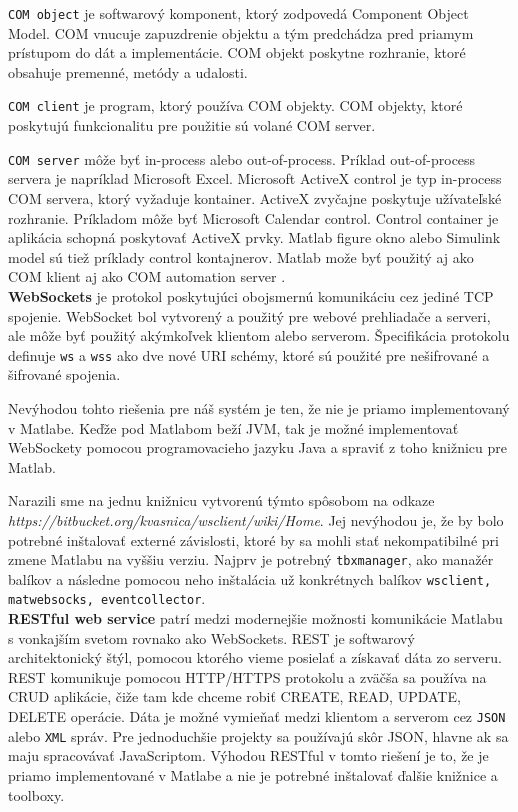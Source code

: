 \verb|COM object| je softwarový komponent, ktorý zodpovedá Component Object Model. COM vnucuje zapuzdrenie objektu a tým predchádza pred priamym prístupom do dát a implementácie. COM objekt poskytne rozhranie, ktoré obsahuje premenné, metódy a udalosti.

\verb|COM client| je program, ktorý používa COM objekty. COM objekty, ktoré poskytujú funkcionalitu pre použitie sú volané COM server.

\verb|COM server| môže byť in-process alebo out-of-process. Príklad out-of-process servera je napríklad Microsoft Excel. Microsoft ActiveX control je typ in-process COM servera, ktorý vyžaduje kontainer. ActiveX zvyčajne poskytuje užívateľské rozhranie. Príkladom môže byť Microsoft Calendar control. Control container je aplikácia schopná poskytovať ActiveX prvky. Matlab figure okno alebo Simulink model sú tiež príklady control kontajnerov. Matlab može byť použitý aj ako COM klient aj ako COM automation server \cite{matlab-com}.\\

\textbf{WebSockets} je protokol poskytujúci obojsmernú komunikáciu cez jediné TCP spojenie. WebSocket bol vytvorený a použitý pre webové prehliadače a serveri, ale môže byť použitý akýmkoľvek klientom alebo serverom. Špecifikácia protokolu definuje \verb|ws| a \verb|wss| ako dve nové URI schémy, ktoré sú použité pre nešifrované a šifrované spojenia.

Nevýhodou tohto riešenia pre náš systém je ten, že nie je priamo implementovaný v Matlabe. Keďže pod Matlabom beží JVM, tak je možné implementovať WebSockety pomocou programovacieho jazyku Java a spraviť z toho knižnicu pre Matlab.

Narazili sme na jednu knižnicu vytvorenú týmto spôsobom na odkaze\\ \textit{https://bitbucket.org/kvasnica/wsclient/wiki/Home}. Jej nevýhodou je, že by bolo potrebné inštalovať externé závislosti, ktoré by sa mohli stať nekompatibilné pri zmene Matlabu na vyššiu verziu. Najprv je potrebný \verb|tbxmanager|, ako manažér balíkov a následne pomocou neho inštalácia už konkrétnych balíkov \verb|wsclient, matwebsocks, eventcollector|.\\

\textbf{RESTful web service} patrí medzi modernejšie možnosti komunikácie Matlabu s vonkajším svetom rovnako ako WebSockets. REST je softwarový architektonický štýl, pomocou ktorého vieme posielať a získavať dáta zo serveru. REST komunikuje pomocou HTTP/HTTPS protokolu a zväčša sa používa na CRUD aplikácie, čiže tam kde chceme robiť CREATE, READ, UPDATE, DELETE operácie. Dáta je možné vymieňať medzi klientom a serverom cez \verb|JSON| alebo \verb|XML| správ. Pre jednoduchšie projekty sa používajú skôr JSON, hlavne ak sa maju spracovávať JavaScriptom. Výhodou RESTful v tomto riešení je to, že je priamo implementované v Matlabe a nie je potrebné inštalovať ďalšie knižnice a toolboxy.

